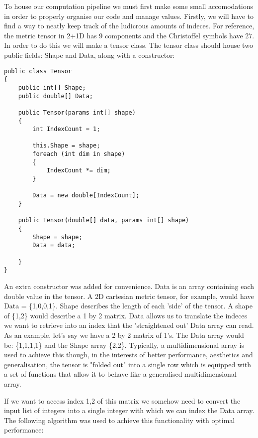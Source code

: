 \documentclass{article}
\begin{document}
To house our computation pipeline we must first make some small accomodations in order to properly organise our code and manage values. Firstly, we will have to find a way to neatly keep track of the ludicrous amounts of indeces. For reference, the metric tensor in 2+1D has 9 components and the Christoffel symbols have 27. In order to do this we will make a tensor class. The tensor class should house two public fields: Shape and Data, along with a constructor:

\begin{verbatim}
public class Tensor
{
    public int[] Shape;
    public double[] Data;

    public Tensor(params int[] shape)
    {
        int IndexCount = 1;

        this.Shape = shape;
        foreach (int dim in shape)
        {
            IndexCount *= dim;
        }

        Data = new double[IndexCount];
    }

    public Tensor(double[] data, params int[] shape)
    {
        Shape = shape;
        Data = data;

    }
}
\end{verbatim}

An extra constructor was added for convenience. Data is an array containing each double value in the tensor. A 2D cartesian metric tensor, for example, would have Data = \{1,0,0,1\}. Shape describes the length of each 'side' of the tensor. A shape of \{1,2\} would describe a 1 by 2 matrix.  Data allows us to translate the indeces we want to retrieve into an index that the 'straightened out' Data array can read. As an example, let's say we have a 2 by 2 matrix of 1's. The Data array would be: \{1,1,1,1\} and the Shape array \{2,2\}. Typically, a multidimensional array is used to achieve this though, in the interests of better performance, aesthetics and generalisation, the tensor is "folded out" into a single row which is equipped with a set of functions that allow it to behave like a generalised multidimensional array. 

If we want to access index 1,2 of this matrix we somehow need to convert the input list of integers into a single integer with which we can index the Data array. The following algorithm was used to achieve this functionality with optimal performance:
\end{document}
